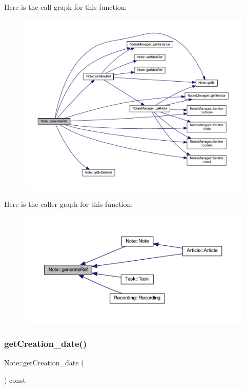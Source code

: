 Here is the call graph for this function\+:\nopagebreak
\begin{figure}[H]
\begin{center}
\leavevmode
\includegraphics[width=350pt]{class_note_a5a0cb370ddd5a3da10fe8aa8a256d661_cgraph}
\end{center}
\end{figure}
Here is the caller graph for this function\+:\nopagebreak
\begin{figure}[H]
\begin{center}
\leavevmode
\includegraphics[width=350pt]{class_note_a5a0cb370ddd5a3da10fe8aa8a256d661_icgraph}
\end{center}
\end{figure}
\mbox{\label{class_note_a89b9be4eae802c78a0959aa9bd408e41}} 
\subsubsection{\texorpdfstring{get\+Creation\+\_\+date()}{getCreation\_date()}}
{\footnotesize\ttfamily Note\+::get\+Creation\+\_\+date (\begin{DoxyParamCaption}{ }\end{DoxyParamCaption}) const\hspace{0.3cm}{\ttfamily [inline]}}



